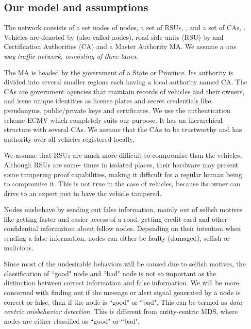 \documentclass[conference]{IEEEtran}[10pt]
\begin{document}
\subsection{Our model and assumptions}
\label{subsec:model}
The network consists of a set  nodes of  nodes, a set of RSUs,   ,  and 
a set of CAs, . 
Vehicles are denoted by  (also called nodes), road side units (RSU) by  and Certification Authorities (CA)  and a Master Authority MA. 
We assume a \emph{one way traffic network, consisting of three lanes}.  

 The MA is headed by the government of a State or Province. Its authority is divided into several smaller regions each 
having a  local authority named CA. 
The CAs are government agencies that maintain records of vehicles and their owners, and issue
unique identities as license plates and secret credentials like pseudonyms, 
public/private keys and certificates. 
We use the authentication scheme ECMV \cite{WJS08} which completely suits our purpose.
It has an  hierarchical structure with several CAs. 
We assume that the CAs to be trustworthy and has
authority over all vehicles registered locally.


  We assume that RSUs are much more difficult to
compromise than the vehicles. Although RSUs are some-
times in isolated places, their hardware may present
some tampering proof capabilities, making it difficult
for a regular human being to compromise it. This is not
true in the case of vehicles, because its owner can drive
to an expert just to have the vehicle tampered.

Nodes misbehave by sending out false information, mainly out of selfish motives like getting faster and easier access of a road, 
getting credit card and other confidential information about fellow nodes. 
Depending on
their intention when sending a false information, nodes
can either be faulty (damaged), selfish or malicious.


Since most of the undesirable behaviors will be caused due to selfish motives, 
the classification of ``good" node and ``bad" node is not so important as the distinction between correct information and false information. 
We will be more
concerned with finding out if the message or alert signal
generated by a node is correct or false, than if the node
is ``good" or ``bad". 
This can be termed as \emph{data-centric misbehavior detection}. 
This is different from entity-centric MDS, where nodes are either classified as ``good" or ``bad". 
\end{document}
